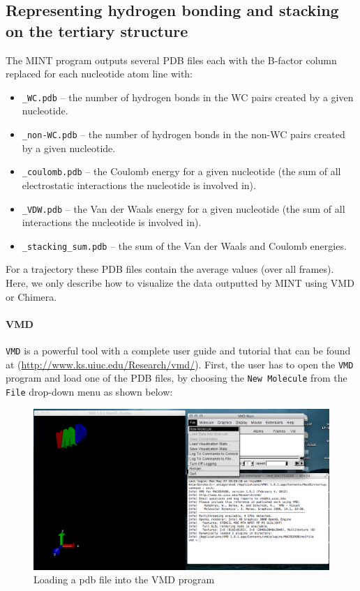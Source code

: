 \documentclass[12pt]{article}
\begin{document}
\subsection{Representing hydrogen bonding and stacking on the tertiary structure} 
The MINT program outputs several PDB files each with the B-factor column  replaced for each nucleotide atom line with:
\begin{itemize}
\item \texttt{\_WC.pdb} -- the number of hydrogen bonds in the WC pairs created by a given nucleotide.
\item \texttt{\_non-WC.pdb} -- the number of hydrogen bonds in the non-WC pairs created by a given nucleotide.
\item \texttt{\_coulomb.pdb} -- the Coulomb energy for a given nucleotide  (the sum of all electrostatic interactions the nucleotide is involved in).
\item \texttt{\_VDW.pdb} -- the Van der Waals energy for a given nucleotide (the sum of all interactions the nucleotide is involved in).
\item \texttt{\_stacking\_sum.pdb} -- the sum of the Van der Waals and Coulomb energies. 
\end{itemize}

For a trajectory these PDB files contain the average values (over all frames). Here, we only describe how to visualize the data outputted by MINT using VMD or Chimera.

\paragraph{VMD}
\texttt{VMD} is a powerful tool with a complete user guide and tutorial that can be found at (\url{http://www.ks.uiuc.edu/Research/vmd/}).
First, the user has to open the \texttt{VMD} program and load one of the PDB files, by choosing the \texttt{New Molecule} from the \texttt{File} drop-down menu as shown below:

\begin{figure}[h!]
\centering
\includegraphics[scale=0.4]{./pictures/vmd1.png}
\caption{Loading a pdb file into the VMD program}
\end{figure}
\end{document}

